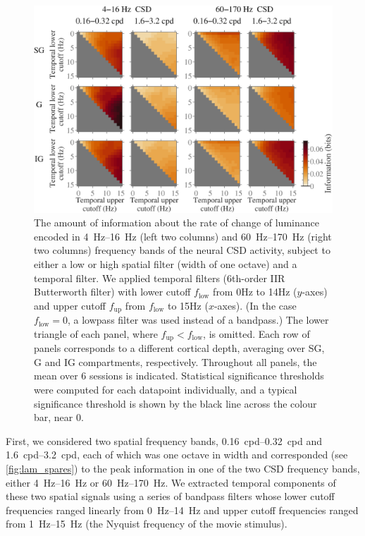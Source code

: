 \begin{figure}[htbp]
\centerline{
\includegraphics[scale=.375]{figs/tmf/tmf-v-tmf-sggig-avg-tmfres1b-2Band-2Crs.eps}
}
%
\caption{
The amount of information about the rate of change of luminance encoded in \SIrange{4}{16}{Hz} (left two columns) and \SIrange{60}{170}{Hz} (right two columns) frequency bands of the neural \ac{CSD} activity, subject to either a low or high spatial filter (width of one octave) and a temporal filter.
We applied temporal filters (6th-order \ac{IIR} Butterworth filter) with lower cutoff $f_\text{low}$ from \num{0}{Hz} to \num{14}{Hz} ($y$-axes) and upper cutoff $f_\text{up}$ from $f_\text{low}$ to \num{15}{Hz} ($x$-axes).
(In the case $f_\text{low} = 0$, a lowpass filter was used instead of a bandpass.)
The lower triangle of each panel, where $f_\text{up} < f_\text{low}$, is omitted.
Each row of panels corresponds to a different cortical depth, averaging over \ac{SG}, \ac{G} and \ac{IG} compartments, respectively.
Throughout all panels, the mean over \num{6} sessions is indicated.
Statistical significance thresholds were computed for each datapoint individually, and a typical significance threshold is shown by the black line across the colour bar, near $0$.
}
\label{fig:lam_tmf}
%
\end{figure}

First, we considered two spatial frequency bands, \SIrange{0.16}{0.32}{cpd} and \SIrange{1.6}{3.2}{cpd}, each of which was one octave in width and corresponded (see \autoref{fig:lam_spares}) to the peak information in one of the two \ac{CSD} frequency bands, either \SIrange{4}{16}{Hz} or \SIrange{60}{170}{Hz}.
We extracted temporal components of these two spatial signals using a series of bandpass filters whose lower cutoff frequencies ranged linearly from \SIrange{0}{14}{Hz} and upper cutoff frequencies ranged from \SIrange{1}{15}{Hz} (the Nyquist frequency of the movie stimulus).

